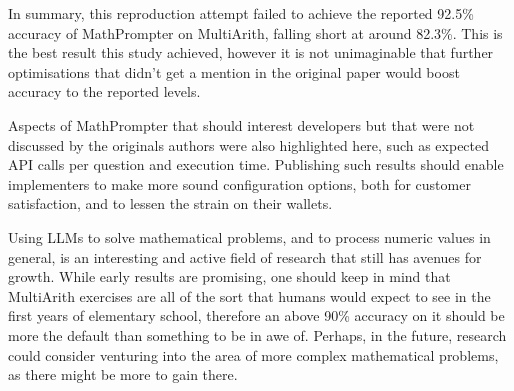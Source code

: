 \label{sec:concl}

In summary, this reproduction attempt failed to achieve the reported 92.5\% accuracy of MathPrompter on MultiArith, falling short at around 82.3\%. This is the best result this study achieved, however it is not unimaginable that further optimisations that didn't get a mention in the original paper would boost accuracy to the reported levels.

Aspects of MathPrompter that should interest developers but that were not discussed by the originals authors were also highlighted here, such as expected API calls per question and execution time. Publishing such results should enable implementers to make more sound configuration options, both for customer satisfaction, and to lessen the strain on their wallets. 

Using LLMs to solve mathematical problems, and to process numeric values in general, is an interesting and active field of research that still has avenues for growth. While early results are promising, one should keep in mind that MultiArith exercises are all of the sort that humans would expect to see in the first years of elementary school, therefore an above 90\% accuracy on it should be more the default than something to be in awe of. Perhaps, in the future, research could consider venturing into the area of more complex mathematical problems, as there might be more to gain there.